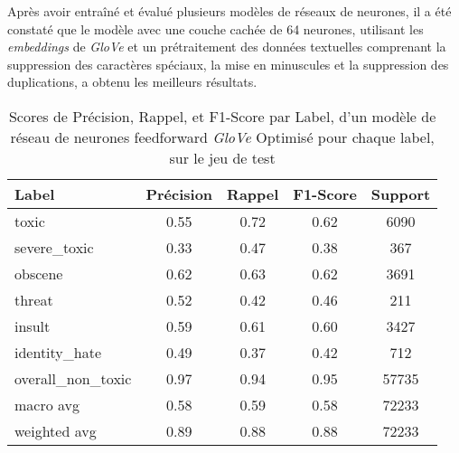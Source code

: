 Après avoir entraîné et évalué plusieurs modèles de réseaux de neurones, il a été constaté que le modèle avec une couche cachée de 64 neurones, utilisant les \textit{embeddings} de \textit{GloVe} et un prétraitement des données textuelles comprenant la suppression des caractères spéciaux, la mise en minuscules et la suppression des duplications, a obtenu les meilleurs résultats.
\begin{table}[ht]
    \centering
    \caption{Scores de Précision, Rappel, et F1-Score par Label, d'un modèle de réseau de neurones feedforward \textit{GloVe} Optimisé pour chaque label, sur le jeu de test}    \begin{tabular}{lcccc}
    \hline
    \textbf{Label} & \textbf{Précision} & \textbf{Rappel} & \textbf{F1-Score} & \textbf{Support} \\ \hline
    toxic          & 0.55               & 0.72            & 0.62              & 6090             \\
    severe\_toxic  & 0.33               & 0.47            & 0.38              & 367              \\
    obscene        & 0.62               & 0.63            & 0.62              & 3691             \\
    threat         & 0.52               & 0.42            & 0.46              & 211              \\
    insult         & 0.59               & 0.61            & 0.60              & 3427             \\
    identity\_hate & 0.49               & 0.37            & 0.42              & 712              \\
    overall\_non\_toxic & 0.97           & 0.94            & 0.95              & 57735            \\\hline
    macro avg      & 0.58              & 0.59            & 0.58              & 72233            \\
    weighted avg   & 0.89               & 0.88            & 0.88              & 72233            \\ \hline
    \end{tabular}
    \label{tab:scores}
\end{table}